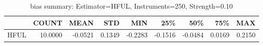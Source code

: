 \begin{table}[ht]
\centering
\caption{bias summary: Estimator=HFUL, Instruments=250, Strength=0.10}
\begin{tabular}{lrrrrrrrr}
\toprule
 & COUNT & MEAN & STD & MIN & 25\% & 50\% & 75\% & MAX \\
\midrule
HFUL & 10.0000 & -0.0521 & 0.1349 & -0.2283 & -0.1516 & -0.0484 & 0.0169 & 0.2150 \\
\bottomrule
\end{tabular}
\end{table}
